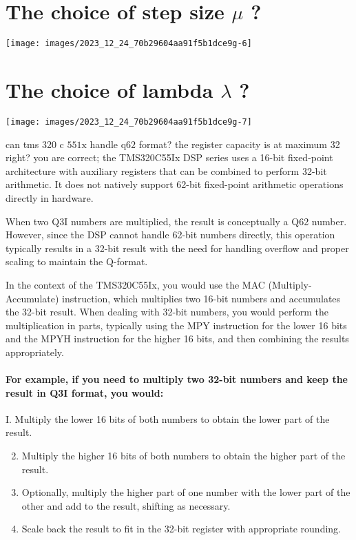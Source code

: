 \section{The choice of step size $\mu$ ?}

\begin{center}
\texttt{[image: images/2023\_12\_24\_70b29604aa91f5b1dce9g-6]}
\end{center}

\section{The choice of lambda $\lambda$ ?}

\begin{center}
\texttt{[image: images/2023\_12\_24\_70b29604aa91f5b1dce9g-7]}
\end{center}

can tms 320 c $551 \mathrm{x}$ handle $\mathrm{q} 62$ format? the register capacity is at maximum 32 right? you are correct; the TMS320C55Ix DSP series uses a 16-bit fixed-point architecture with auxiliary registers that can be combined to perform 32-bit arithmetic. It does not natively support 62-bit fixed-point arithmetic operations directly in hardware.

When two Q3I numbers are multiplied, the result is conceptually a Q62 number. However, since the DSP cannot handle 62-bit numbers directly, this operation typically results in a 32-bit result with the need for handling overflow and proper scaling to maintain the Q-format.

In the context of the TMS320C55Ix, you would use the MAC (Multiply-Accumulate) instruction, which multiplies two 16-bit numbers and accumulates the 32-bit result. When dealing with 32-bit numbers, you would perform the multiplication in parts, typically using the MPY instruction for the lower 16 bits and the MPYH instruction for the higher 16 bits, and then combining the results appropriately.

\paragraph{For example, if you need to multiply two 32-bit numbers and keep the result in Q3I format, you would:}

I. Multiply the lower 16 bits of both numbers to obtain the lower part of the result.

\begin{enumerate}
  \setcounter{enumi}{1}
  \item Multiply the higher 16 bits of both numbers to obtain the higher part of the result.

  \item Optionally, multiply the higher part of one number with the lower part of the other and add to the result, shifting as necessary.

  \item Scale back the result to fit in the 32-bit register with appropriate rounding.

\end{enumerate}

